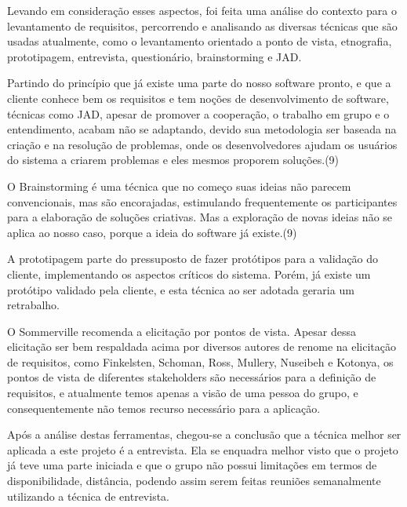 Levando em consideração esses aspectos, foi feita uma análise do contexto para o levantamento de requisitos, percorrendo e analisando as diversas técnicas que são usadas atualmente, como o levantamento orientado a ponto de vista, etnografia, prototipagem, entrevista, questionário, brainstorming e JAD.

Partindo do princípio que já existe uma parte do nosso software pronto, e que a cliente conhece bem os requisitos e tem noções de desenvolvimento de software, técnicas como JAD, apesar de promover a cooperação, o trabalho em grupo e o entendimento, acabam não se adaptando, devido sua metodologia ser baseada na criação e na resolução de problemas, onde os desenvolvedores ajudam os usuários do sistema a criarem problemas e eles mesmos proporem soluções.(9)

O Brainstorming é uma técnica que no começo suas ideias não parecem convencionais, mas são encorajadas, estimulando frequentemente os participantes para a elaboração de soluções criativas. Mas a exploração de novas ideias não se aplica ao nosso caso, porque a ideia do software já existe.(9)

A prototipagem parte do pressuposto de fazer protótipos para a validação do cliente, implementando os aspectos críticos do sistema. Porém, já existe um protótipo validado pela cliente, e esta técnica ao ser adotada geraria um retrabalho.

O Sommerville recomenda a elicitação por pontos de vista. Apesar dessa elicitação ser bem respaldada acima por diversos autores de renome na elicitação de requisitos, como Finkelsten, Schoman, Ross, Mullery, Nuseibeh e Kotonya, os pontos de vista de diferentes stakeholders são necessários para a definição de requisitos, e atualmente temos apenas a visão de uma pessoa do grupo, e consequentemente não temos recurso necessário para a aplicação.

Após a análise destas ferramentas, chegou-se a conclusão que a  técnica melhor ser aplicada a este projeto é a entrevista. Ela se enquadra melhor visto que o projeto já teve uma parte iniciada e que o grupo não possui limitações em termos de disponibilidade, distância, podendo assim serem feitas reuniões semanalmente utilizando a técnica de entrevista.
